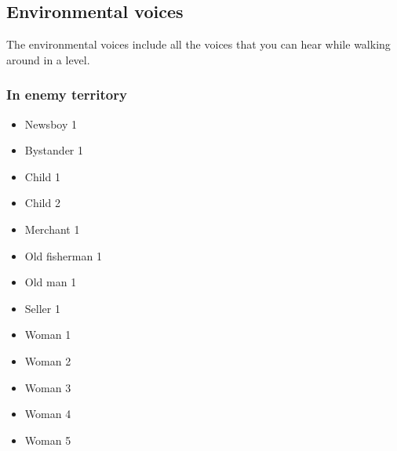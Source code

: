 \subsection{Environmental voices}
The environmental voices include all the voices that you can hear while walking around in a level.

\subsubsection*{In enemy territory}
\begin{itemize}
	\item Newsboy 1
	\item Bystander 1
	\item Child 1
	\item Child 2
	\item Merchant 1
	\item Old fisherman 1
	\item Old man 1
	\item Seller 1
	\item Woman 1
	\item Woman 2
	\item Woman 3
	\item Woman 4
	\item Woman 5
\end{itemize}
